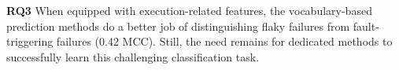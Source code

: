 \begin{tcolorbox}[
    left=2pt,right=2pt,top=2pt,bottom=2pt, %
    arc=0pt, %
    boxrule=1.2pt %
]
\textbf{RQ3} When equipped with execution-related features, the vocabulary-based prediction methods do a better job of distinguishing flaky failures from fault-triggering failures (0.42 MCC). Still, the need remains for dedicated methods to successfully learn this challenging classification task.

\end{tcolorbox}